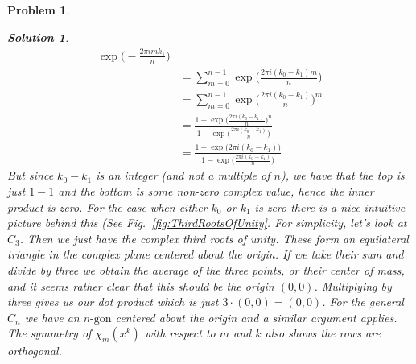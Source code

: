 \documentclass{article}
\theoremstyle{normal}
\newtheorem{problem}{Problem}
\theoremstyle{thmit}
\newtheorem*{solution}{Solution}
\begin{document}
\begin{problem}
\begin{enumerate}
\begin{solution}
\begin{subequations}
\begin{align}
                            \exp\big(-\frac{2\pi{i}mk_{1}}{n}\big)\\
                        &=\sum_{m=0}^{n-1}\exp\big(\frac{2\pi{i}(k_{0}-k_{1})m}{n}\big)\\
                        &=\sum_{m=0}^{n-1}\exp\big(\frac{2\pi{i}(k_{0}-k_{1})}{n}\big)^{m}\\
                        &=\frac{1-\exp\big(\frac{2\pi{i}(k_{0}-k_{1})}{n}\big)^{n}}
                               {1-\exp\big(\frac{2\pi{i}(k_{0}-k_{1})}{n}\big)}\\
                        &=\frac{1-\exp\big(2\pi{i}(k_{0}-k_{1})\big)}
                               {1-\exp\big(\frac{2\pi{i}(k_{0}-k_{1})}{n}\big)}
                \end{align}
            \end{subequations}
            But since $k_{0}-k_{1}$ is an integer (and not a multiple of $n$), we have that the top is
            just $1-1$ and the bottom is some non-zero complex value, hence the inner product is zero. For
            the case when either $k_{0}$ or $k_{1}$ is zero there is a nice intuitive picture behind this
            (See Fig.~\ref{fig:ThirdRootsOfUnity}. For simplicity, let's look at $C_{3}$. Then we just
            have the complex third roots of unity. These form an equilateral triangle in the complex
            plane centered about the origin. If we take their sum and divide by three we obtain the
            \textit{average} of the three points, or their \textit{center of mass}, and it seems rather
            clear that this should be the origin $(0,0)$. Multiplying by three gives us our dot product
            which is just $3\cdot(0,0)=(0,0)$. For the general $C_{n}$ we have an $n\textrm{-gon}$ centered
            about the origin and a similar argument applies.
            The symmetry of $\chi_{m}(x^{k})$ with respect to $m$ and $k$ also shows the rows are
            orthogonal.
        \end{solution}
    \end{enumerate}
\end{problem}
\end{document}
